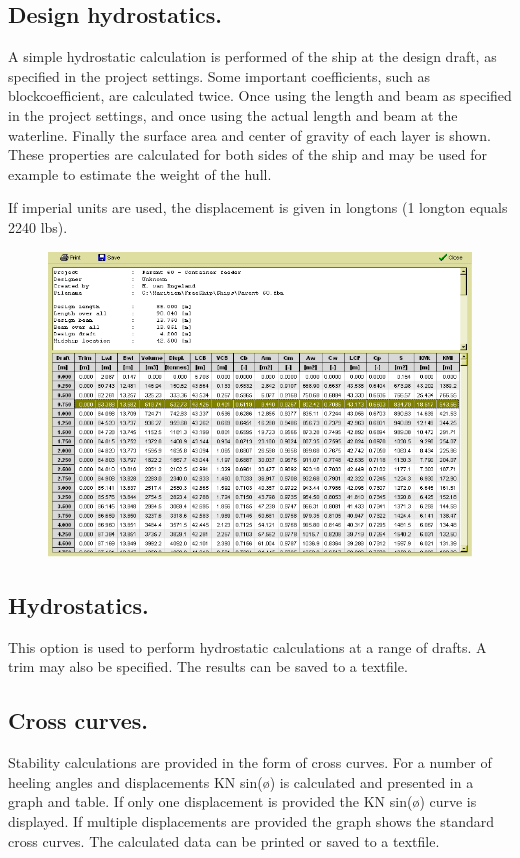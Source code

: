 \documentclass[12pt]{article}
\begin{document}
\subsection{Design hydrostatics.} \label{design-hydrostatics}
A simple hydrostatic calculation is performed of the ship at the
design draft, as specified in the project settings. Some important
coefficients, such as blockcoefficient, are calculated twice. Once
using the length and beam as specified in the project settings, and
once using the actual length and beam at the waterline. Finally the
surface area and center of gravity of each layer is shown. These
properties are calculated for both sides of the ship and may be used
for example to estimate the weight of the hull.

If imperial units are used, the displacement is given in longtons (1
longton equals 2240 lbs).

\begin{figure}[h]
        \centering
        \includegraphics[width=15cm,natwidth=655,natheight=472]{hydrostaticsdialog.png}
        \caption{}
        \label{fig:hydrostaticsd}
\end{figure}

\subsection{Hydrostatics.}
This option is used to perform hydrostatic calculations at a range of
drafts. A trim may also be specified. The results can be saved to a
textfile.

\subsection{Cross curves.}
Stability calculations are provided in the form of cross curves. For a
number of heeling angles and displacements KN sin(ø) is calculated and
presented in a graph and table. If only one displacement is provided
the KN sin(ø) curve is displayed. If multiple displacements are
provided the graph shows the standard cross curves. The calculated
data can be printed or saved to a textfile.
\end{document}
